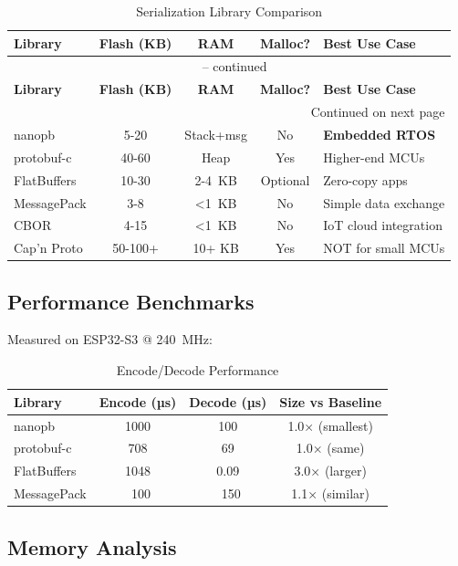 \documentclass[12pt,letterpaper]{article}
\begin{document}
\begin{longtable}{lcccp{4cm}}
\caption{Serialization Library Comparison} \\
\toprule
\textbf{Library} & \textbf{Flash (KB)} & \textbf{RAM} & \textbf{Malloc?} & \textbf{Best Use Case} \\
\midrule
\endfirsthead
\multicolumn{5}{c}{{\tablename\ \thetable{} -- continued}} \\
\toprule
\textbf{Library} & \textbf{Flash (KB)} & \textbf{RAM} & \textbf{Malloc?} & \textbf{Best Use Case} \\
\midrule
\endhead
\midrule
\multicolumn{5}{r}{{Continued on next page}} \\
\endfoot
\bottomrule
\endlastfoot
nanopb & 5-20 & Stack+msg & No & \textbf{Embedded RTOS} \\
protobuf-c & 40-60 & Heap & Yes & Higher-end MCUs \\
FlatBuffers & 10-30 & 2-4~KB & Optional & Zero-copy apps \\
MessagePack & 3-8 & <1~KB & No & Simple data exchange \\
CBOR & 4-15 & <1~KB & No & IoT cloud integration \\
Cap'n Proto & 50-100+ & 10+ KB & Yes & NOT for small MCUs \\
\end{longtable}

\subsection{Performance Benchmarks}

Measured on ESP32-S3 @ 240~MHz:

\begin{table}[H]
\centering
\caption{Encode/Decode Performance}
\begin{tabular}{lccc}
\toprule
\textbf{Library} & \textbf{Encode (µs)} & \textbf{Decode (µs)} & \textbf{Size vs Baseline} \\
\midrule
nanopb & 1000 & 100 & 1.0× (smallest) \\
protobuf-c & 708 & 69 & 1.0× (same) \\
FlatBuffers & 1048 & 0.09 & 3.0× (larger) \\
MessagePack & ~100 & ~150 & 1.1× (similar) \\
\bottomrule
\end{tabular}
\end{table}

\subsection{Memory Analysis}
\end{document}
